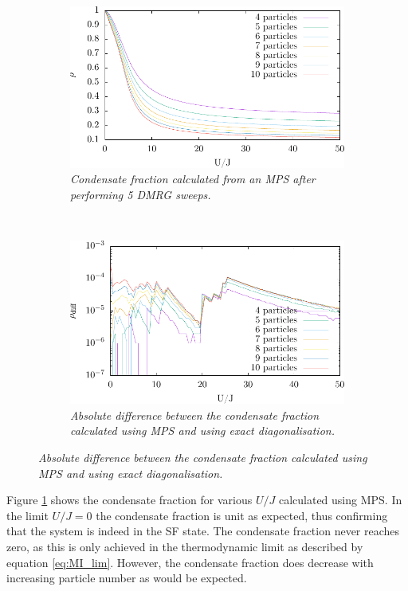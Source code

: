 \begin{figure}[h!]
    \centering
    \begin{subfigure}[t]{0.49\textwidth}
        \includegraphics[width=\textwidth]{Figures/Condfrac_4to10.pdf}
        \caption{\textit{Condensate fraction calculated from an MPS after performing 5 DMRG sweeps.}}
        \label{fig:Condfrac_4to10}
    \end{subfigure}
    ~
    \begin{subfigure}[t]{0.49\textwidth}
        \includegraphics[width=\textwidth]{Figures/Confrac_exactvsMPS.pdf}
        \caption{\textit{Absolute difference between the condensate fraction calculated using MPS and using exact diagonalisation.}}
        \label{fig:Condfrac_exactvsMPS}
    \end{subfigure}    
\end{figure}
Figure \ref{fig:Condfrac_4to10} shows the condensate fraction for various $U/J$ calculated using MPS. In the limit $U/J = 0$ the condensate fraction is unit as expected, thus confirming that the system is indeed in the SF state. The condensate fraction never reaches zero, as this is only achieved in the thermodynamic limit as described by equation \eqref{eq:MI_lim}. However, the condensate fraction does decrease with increasing particle number as would be expected.\\
